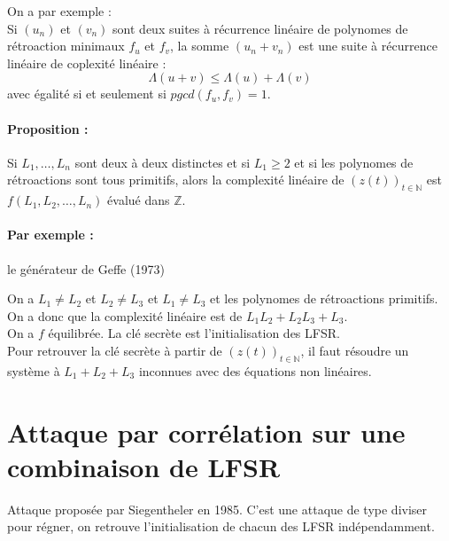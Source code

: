 \documentclass[12pt,a4paper]{report}
\begin{document}
On a par exemple : \\
Si $(u_n)$ et $(v_n)$ sont deux suites à récurrence linéaire de polynomes de rétroaction minimaux $f_u$ et $f_v$, la somme $(u_n+v_n)$ est une suite à récurrence linéaire de coplexité linéaire :
$$ \Lambda(u+v) \leqslant \Lambda (u) + \Lambda (v)$$
avec égalité si et seulement si $pgcd(f_u,f_v) = 1$.

\paragraph{Proposition :\\}
\begin{center}
  \scalebox{0.6}{}	
\end{center}
Si $L_1,\ldots,L_n$ sont deux à deux distinctes et si $L_1 \geqslant 2$ et si les polynomes de rétroactions sont tous primitifs, alors la complexité linéaire de $(z(t))_{t \in \mathbb{N}}$ est $f(L_1,L_2,\ldots,L_n)$ évalué dans $\mathbb{Z}$.
\paragraph{Par exemple :} le générateur de Geffe (1973)\\
\begin{figure}[h!]
	\centering
  \scalebox{0.6}{}	
\end{figure}
On a $L_1 \neq L_2$ et $L_2 \neq L_3$ et $L_1 \neq L_3$ et les polynomes de rétroactions primitifs. On a donc que la complexité linéaire est de $ L_1L_2 + L_2L_3+L_3 $.\\
On a $f$ équilibrée. La clé secrète est l'initialisation des LFSR.\\
Pour retrouver la clé secrète à partir de $(z(t))_{t \in \mathbb{N}}$, il faut résoudre un système à $L_1+L_2+L_3$ inconnues avec des équations non linéaires.
\section{Attaque par corrélation sur une combinaison de LFSR}
Attaque proposée par Siegentheler en 1985. C'est une attaque de type diviser pour régner, on retrouve l'initialisation de chacun des LFSR indépendamment.
\end{document}

